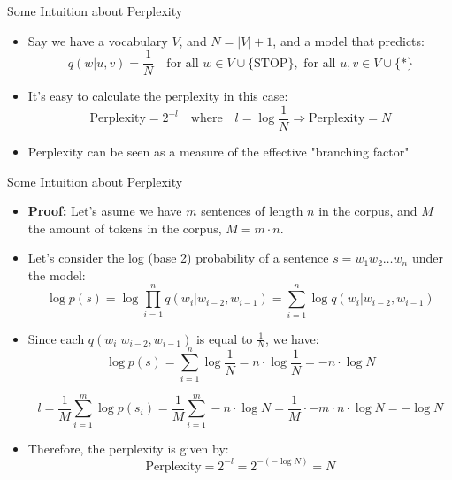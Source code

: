 \documentclass[handout]{beamer}
\begin{document}
\begin{frame}{Some Intuition about Perplexity}
    \scriptsize
    \begin{itemize}
        \item Say we have a vocabulary $V$, and $N = |V| + 1$, and a model that predicts:
        \[
            q(w|u, v) = \frac{1}{N} \quad \text{for all } w \in V \cup \{\text{STOP}\}, \text{ for all } u, v \in V \cup \{*\}
        \]
        \item It's easy to calculate the perplexity in this case:
        \[
            \text{Perplexity} = 2^{-l} \quad \text{where} \quad l = \log \frac{1}{N} \Rightarrow \text{Perplexity} = N
        \]
        \item Perplexity can be seen as a measure of the effective "branching factor"
    \end{itemize}
\end{frame}

\begin{frame}{Some Intuition about Perplexity}
    \scriptsize
    \begin{itemize}
        
        
        \item \textbf{Proof:}  Let's asume we have $m$ sentences of length $n$ in the corpus, and $M$ the amount of tokens in the corpus, $M=m \cdot n$.
        
        \item Let's consider the log (base 2) probability of a sentence $s = w_1 w_2 \dots w_n$ under the model:
        \[
            \log p(s) = \log \prod_{i=1}^{n} q(w_i|w_{i-2}, w_{i-1}) = \sum_{i=1}^{n} \log q(w_i|w_{i-2}, w_{i-1})
        \]
        \item Since each $q(w_i|w_{i-2}, w_{i-1})$ is equal to $\frac{1}{N}$, we have:
        \[
            \log p(s) = \sum_{i=1}^{n} \log \frac{1}{N} = n \cdot \log \frac{1}{N} = -n \cdot \log N
        \]
        
        
        \[
            l =  \frac{1}{M} \sum_{i=1}^{m} \log p(s_i) = \frac{1}{M} \sum_{i=1}^{m} -n \cdot \log N  = \frac{1}{M} \cdot -m \cdot n \cdot \log N = - \log N 
        \]
        
        
        
        \item Therefore, the perplexity is given by:
        \[
            \text{Perplexity} = 2^{-l} = 2^{-(- \log N)} = N
        \]
    \end{itemize}
\end{frame}
\end{document}
